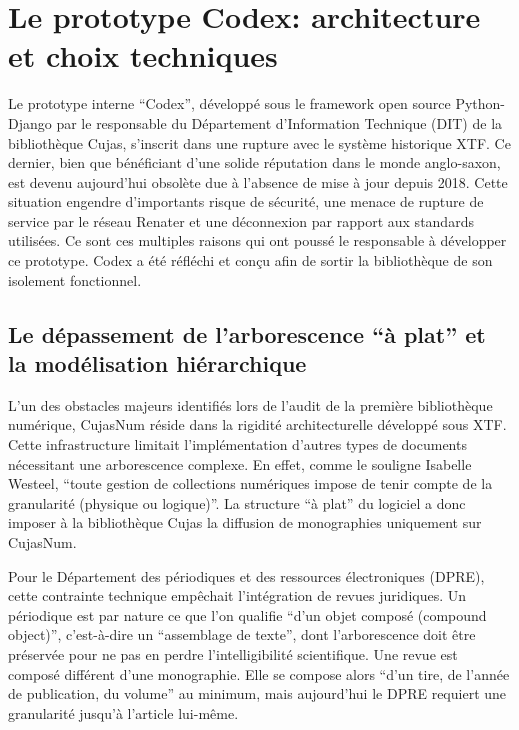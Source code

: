 \section{Le prototype Codex: architecture et choix techniques}
Le prototype interne \enquote{Codex}, développé sous le framework open source Python-Django par le responsable du Département d'Information Technique (DIT) de la bibliothèque Cujas, s'inscrit dans une rupture avec le système historique XTF. Ce dernier, bien que bénéficiant d'une solide réputation dans le monde anglo-saxon, est devenu aujourd'hui obsolète due à l'absence de mise à jour depuis 2018. Cette situation engendre d'importants risque de sécurité, une menace de rupture de service par le réseau Renater et une déconnexion par rapport aux standards utilisées. Ce sont ces multiples raisons qui ont poussé le responsable à développer ce prototype. Codex a été réfléchi et conçu afin de sortir la bibliothèque de son isolement fonctionnel.

\subsection{Le dépassement de l'arborescence \enquote{à plat} et la modélisation hiérarchique}
L'un des obstacles majeurs identifiés lors de l'audit de la première bibliothèque numérique, CujasNum réside dans la rigidité architecturelle développé sous XTF. Cette infrastructure limitait l'implémentation d'autres types de documents nécessitant une arborescence complexe. En effet, comme le souligne Isabelle Westeel, \enquote{toute gestion de collections numériques impose de tenir compte de la granularité (physique ou logique)}. La structure \enquote{à plat} du logiciel a donc imposer à la bibliothèque Cujas la diffusion de monographies uniquement sur CujasNum. 

Pour le Département des périodiques et des ressources électroniques (DPRE), cette contrainte technique empêchait l'intégration de revues juridiques. Un périodique est par nature ce que l'on qualifie \enquote{d'un objet composé (compound object)}, c'est-à-dire un \enquote{assemblage de texte}, dont l'arborescence doit être préservée pour ne pas en perdre l'intelligibilité scientifique. Une revue est composé différent d'une monographie. Elle se compose alors \enquote{d'un tire, de l'année de publication, du volume} au minimum, mais aujourd'hui le DPRE requiert une granularité jusqu'à l'article lui-même. 

